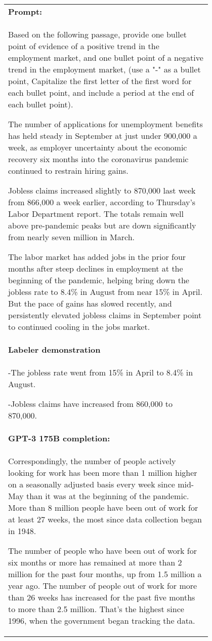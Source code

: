 \begin{figure}[hp]
    \centering
    \small
    \begin{tabular}{p{0.95\linewidth}}
    \toprule 
        \textbf{Prompt:}   \\
         Based on the following passage, provide one bullet point of evidence of a positive trend in the employment market, and one bullet point of a negative trend in the employment market, (use a "-" as a bullet point, Capitalize the first letter of the first word for each bullet point, and include a period at the end of each bullet point).

The number of applications for unemployment benefits has held steady in September at just under 900,000 a week, as employer uncertainty about the economic recovery six months into the coronavirus pandemic continued to restrain hiring gains.

Jobless claims increased slightly to 870,000 last week from 866,000 a week earlier, according to Thursday’s Labor Department report. The totals remain well above pre-pandemic peaks but are down significantly from nearly seven million in March.

The labor market has added jobs in the prior four months after steep declines in employment at the beginning of the pandemic, helping bring down the jobless rate to 8.4\% in August from near 15\% in April. But the pace of gains has slowed recently, and persistently elevated jobless claims in September point to continued cooling in the jobs market.   \\ \midrule
\textbf{Labeler demonstration}\\ 
-The jobless rate went from 15\% in April to 8.4\% in August. 

-Jobless claims have increased from 860,000 to 870,000.
\\ \midrule 
        \textbf{GPT-3 175B completion:} \\
        
         Correspondingly, the number of people actively looking for work has been more than 1 million higher on a seasonally adjusted basis every week since mid-May than it was at the beginning of the pandemic. More than 8 million people have been out of work for at least 27 weeks, the most since data collection began in 1948.

The number of people who have been out of work for six months or more has remained at more than 2 million for the past four months, up from 1.5 million a year ago. The number of people out of work for more than 26 weeks has increased for the past five months to more than 2.5 million. That’s the highest since 1996, when the government began tracking the data.


\end{tabular}
\end{figure}
